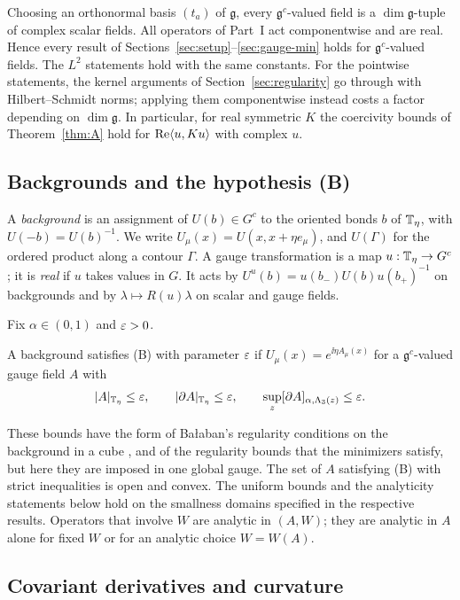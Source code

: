 Choosing an orthonormal basis $(t_a)$ of $\mathfrak g$, every $\mathfrak g^c$-valued field is a $\dim\mathfrak g$-tuple of complex scalar fields. All operators of Part~I act componentwise and are real. Hence every result of Sections~\ref{sec:setup}--\ref{sec:gauge-min} holds for $\mathfrak g^c$-valued fields. The $L^2$ statements hold with the same constants. For the pointwise statements, the kernel arguments of Section~\ref{sec:regularity} go through with Hilbert--Schmidt norms; applying them componentwise instead costs a factor depending on $\dim\mathfrak g$. In particular, for real symmetric $K$ the coercivity bounds of Theorem~\ref{thm:A} hold for $\operatorname{Re}\langle u,Ku\rangle$ with complex $u$.

\subsection{Backgrounds and the hypothesis (B)}

A \emph{background} is an assignment of $U(b)\in G^c$ to the oriented bonds $b$ of $\mathbb T_\eta$, with $U(-b)=U(b)^{-1}$. We write $U_\mu(x)=U(x,x+\eta e_\mu)$, and $U(\Gamma)$ for the ordered product along a contour $\Gamma$. A gauge transformation is a map $u:\mathbb T_\eta\to G^c$; it is \emph{real} if $u$ takes values in $G$. It acts by $U^u(b)=u(b_-)U(b)u(b_+)^{-1}$ on backgrounds and by $\lambda\mapsto R(u)\lambda$ on scalar and gauge fields.

Fix $\alpha\in(0,1)$ and $\varepsilon>0$.

\begin{definition}[Hypothesis (B)]
A background satisfies (B) with parameter $\varepsilon$ if $U_\mu(x)=e^{\ii\eta A_\mu(x)}$ for a $\mathfrak g^c$-valued gauge field $A$ with
\[
|A|_{\mathbb T_\eta}\le\varepsilon,\qquad|\partial A|_{\mathbb T_\eta}\le\varepsilon,\qquad\sup_z[\partial A]_{\alpha,\Lambda_3(z)}\le\varepsilon .
\]
\end{definition}

These bounds have the form of Ba\l aban's regularity conditions on the background in a cube \cite[(3.35)--(3.36)]{BalBackground}, and of the regularity bounds \cite[(9)]{BalVar} that the minimizers satisfy, but here they are imposed in one global gauge. The set of $A$ satisfying (B) with strict inequalities is open and convex. The uniform bounds and the analyticity statements below hold on the smallness domains specified in the respective results. Operators that involve $W$ are analytic in $(A,W)$; they are analytic in $A$ alone for fixed $W$ or for an analytic choice $W=W(A)$.

\subsection{Covariant derivatives and curvature}

